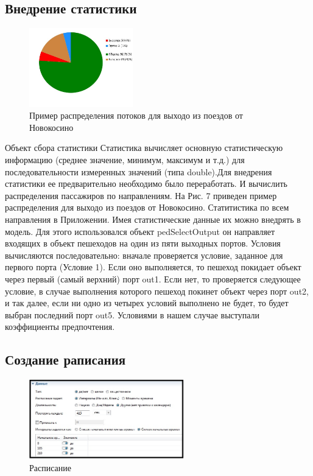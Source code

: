 \documentclass[12pt]{article}
\begin{document}
		\subsection{Внедрение статистики}
		
 \begin{figure}
  	\begin{center}
  	  	\includegraphics[width=0.4\textwidth]{stat_raspr.jpg}
 	 \end{center}
	  	\caption{Пример распределения потоков для выходо из поездов от Новокосино}
\end{figure}
Объект сбора статистики Статистика вычисляет основную статистическую информацию (среднее значение, минимум, максимум и т.д.) для последовательности измеренных значений (типа double).Для внедрения статистики ее предварительно необходимо было переработать. И вычислить распределения пассажиров по направлениям. На Рис. 7 приведен пример распределения для  выходо из поездов от Новокосино. Статитистика по всем направления в Приложении. Имея статистические данные их можно внедрять в модель. Для этого использовался объект pedSelectOutput он направляет входящих в объект пешеходов на один из пяти выходных портов. Условия вычисляются последовательно: вначале проверяется условие, заданное для первого порта (Условие 1). Если оно выполняется, то пешеход покидает объект через первый (самый верхний) порт out1. Если нет, то проверяется следующее условие, в случае выполнения которого пешеход покинет объект через порт out2, и так далее, если ни одно из четырех условий выполнено не будет, то будет выбран последний порт out5. Условиями в нашем случае выступали коэффициенты предпочтения.



		\subsection{Создание раписания}
		
 \begin{figure}
  	\begin{center}
  	  	\includegraphics[width=0.6\textwidth]{sch.jpg}
 	 \end{center}
	  	\caption{Расписание}
\end{figure}
\end{document}
